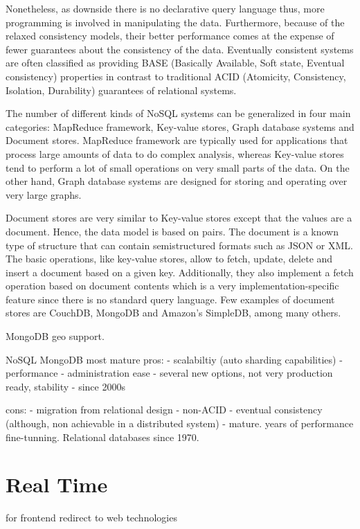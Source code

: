 Nonetheless, as downside there is no declarative query language thus, more programming is involved in manipulating the data. Furthermore, because of the relaxed consistency models, their better performance comes at the expense of fewer guarantees about the consistency of the data. Eventually consistent systems are often classified as providing BASE (Basically Available, Soft state, Eventual consistency) properties in contrast to traditional ACID (Atomicity, Consistency, Isolation, Durability) guarantees of relational systems. 

The number of different kinds of NoSQL systems can be generalized in four main categories: MapReduce framework, Key-value stores, Graph database systems and Document stores. MapReduce framework are typically used for applications that process large amounts of data to do complex analysis, whereas Key-value stores tend to perform a lot of small operations on very small parts of the data. On the other hand, Graph database systems are designed for storing and operating over very large graphs.

Document stores are very similar to Key-value stores except that the values are a document. Hence, the data model is based on  pairs. The document is a known type of structure that can contain semistructured formats such as JSON or XML. The basic operations, like key-value stores, allow to fetch, update, delete and insert a document based on a given key. Additionally, they also implement a fetch operation based on document contents which is a very implementation-specific feature since there is no standard query language. Few examples of document stores are CouchDB, MongoDB and Amazon's SimpleDB, among many others.  

MongoDB geo support.

NoSQL
MongoDB most mature
pros:
- scalabiltiy (auto sharding capabilities)
- performance
- administration ease
- several new options, not very production ready, stability
- since 2000s

cons: 
- migration from relational design 
- non-ACID
- eventual consistency (although, non achievable in a distributed system)
- mature. years of performance fine-tunning. Relational databases since 1970.



\section{Real Time}
for frontend redirect to web technologies

